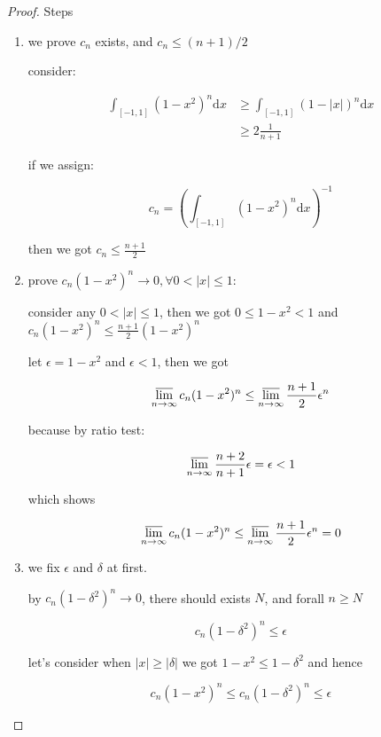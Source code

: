 \begin{proof}
    Steps

    \begin{enumerate}
        \item we prove $c_n$ exists, and $c_n \le (n+1)/2$


    consider:

    \begin{align*}
        \int_{[-1,1]}(1-x^2)^n\mathrm{d}x &\ge \int_{[-1,1]}(1-|x|)^n\mathrm{d}x \\
        & \ge 2 \frac{1}{n+1}
    \end{align*}

    if we assign:


    \[
        c_n = \left(\int_{[-1,1]}(1-x^2)^n\mathrm{d}x \right)^{-1}
    \]

    then we got $c_n \le \frac{n+1}{2}$

    \item prove $c_n(1-x^2)^n \to 0, \forall 0 < |x| \le 1$:
    
    consider any $0 < |x| \le 1$, then we got $0 \le 1-x^2 < 1$ and
    $c_n(1-x^2)^n \le \frac{n+1}{2}(1-x^2)^n$

    let $\epsilon = 1-x^2$ and $\epsilon < 1$, then we got

    \[
        \varlimsup_{n \to \infty}c_n(1-x^2)^n \le \varlimsup_{n \to \infty}\frac{n+1}{2}\epsilon ^n 
    \]

    because by ratio test:

    \[
         \varlimsup_{n \to \infty}\frac{n+2}{n+1}\epsilon = \epsilon < 1
    \]

    which shows 

    \[
        \varlimsup_{n \to \infty}c_n(1-x^2)^n \le \varlimsup_{n \to \infty}\frac{n+1}{2}\epsilon ^n = 0
    \]

    \item we fix $\epsilon$ and $\delta$ at first.
    
    by $c_n(1-\delta^2)^n \to 0$, there should exists $N$, and forall $n \ge N$

    \[
        c_n(1-\delta^2)^n \le \epsilon
    \]

    let's consider when $|x| \ge |\delta|$ we got $1-x^2 \le 1-\delta^2$ and hence

    \[
        c_n(1-x^2)^n \le c_n(1-\delta^2)^n \le \epsilon
    \]

    \end{enumerate}


\end{proof}


